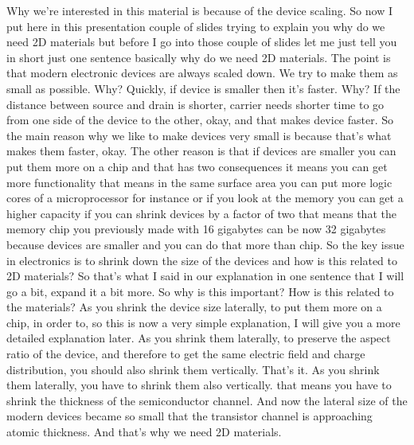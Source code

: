 Why we're interested in this material is because of the device scaling. So now I put here in this presentation couple of slides trying to explain you why do we need 2D materials but before I go into those couple of slides let me just tell you in short just one sentence basically why do we need 2D materials. The point is that modern electronic devices are always scaled down. We try to make them as small as possible. Why? Quickly, if device is smaller then it's faster. Why? If the distance between source and drain is shorter, carrier needs shorter time to go from one side of the device to the other, okay, and that makes device faster. So the main reason why we like to make devices very small is because that's what makes them faster, okay. The other reason is that if devices are smaller you can put them more on a chip and that has two consequences it means you can get more functionality that means in the same surface area you can put more logic cores of a microprocessor for instance or if you look at the memory you can get a higher capacity if you can shrink devices by a factor of two that means that the memory chip you previously made with 16 gigabytes can be now 32 gigabytes because devices are smaller and you can do that more than chip. So the key issue in electronics is to shrink down the size of the devices and how is this related to 2D materials? So that's what I said in our explanation in one sentence that I will go a bit, expand it a bit more. So why is this important? How is this related to the materials? As you shrink the device size laterally, to put them more on a chip, in order to, so this is now a very simple explanation, I will give you a more detailed explanation later. As you shrink them laterally, to preserve the aspect ratio of the device, and therefore to get the same electric field and charge distribution, you should also shrink them vertically. That's it. As you shrink them laterally, you have to shrink them also vertically. that means you have to shrink the thickness of the semiconductor channel. And now the lateral size of the modern devices became so small that the transistor channel is approaching atomic thickness. And that's why we need 2D materials.
